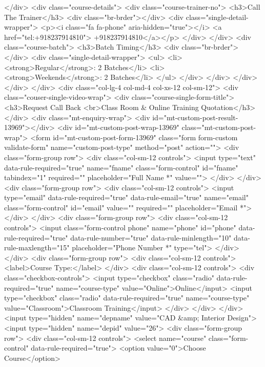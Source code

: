 {</div>
<div class="course-details">
<div class="course-trainer-no">
<h3>Call The Trainer</h3>
<div class="br-brder"></div>
<div class="single-detail-wrapper">
<p><i class="fa fa-phone" aria-hidden="true"></i> <a href="tel:+918237914810"> +918237914810</a></p>
</div>
</div>
<div class="course-batch">
<h3>Batch Timing</h3>
<div class="br-brder"></div>
<div class="single-detail-wrapper">
<ul>
<li><strong>Regular</strong>: 2 Batches</li>
<li><strong>Weekends</strong>: 2 Batches</li>
</ul>
</div>
</div>
</div>
</div>
</div>
<div class="col-lg-4 col-md-4 col-xs-12 col-sm-12">
<div class="couser-single-video-wrap">
<div class="course-single-form-title">
<h3>Request Call Back <br>Class Room & Online Training Quotation</h3>
</div>
<div class="mt-enquiry-wrap">
<div id="mt-custom-post-result-13969"></div>
<div id="mt-custom-post-wrap-13969" class="mt-custom-post-wrap">
<form id="mt-custom-post-form-13969" class="form form-custom validate-form" name="custom-post-type" method="post" action="">
<div class="form-group row">
<div class="col-sm-12 controls">
<input type="text" data-rule-required="true" name="fname" class="form-control" id="fname" tabindex="1" required="" placeholder="Full Name *" value="">
</div>
</div>
<div class="form-group row">
<div class="col-sm-12 controls">
<input type="email" data-rule-required="true" data-rule-email="true" name="email" class="form-control" id="email" value="" required="" placeholder="Email *">
</div>
</div>
<div class="form-group row">
<div class="col-sm-12 controls">
<input class="form-control phone" name="phone" id="phone" data-rule-required="true" data-rule-number="true" data-rule-minlength="10" data-rule-maxlength="15" placeholder="Phone Number *" type="tel">
</div>
</div>
<div class="form-group row">
 <div class="col-sm-12 controls">
<label>Course Type:</label>
</div>
<div class="col-sm-12 controls">
<div class="checkbox-controls">
<input type="checkbox" class="radio" data-rule-required="true" name="course-type" value="Online">Online</input>
<input type="checkbox" class="radio" data-rule-required="true" name="course-type" value="Classroom">Classroom Training</input>
</div>
</div>
</div>
<input type="hidden" name="depname" value="CAD &amp; Interior Design">
<input type="hidden" name="depid" value="26">
<div class="form-group row">
<div class="col-sm-12 controls">
<select name="course" class="form-control" data-rule-required="true">
<option value="0">Choose Course</option>
}
